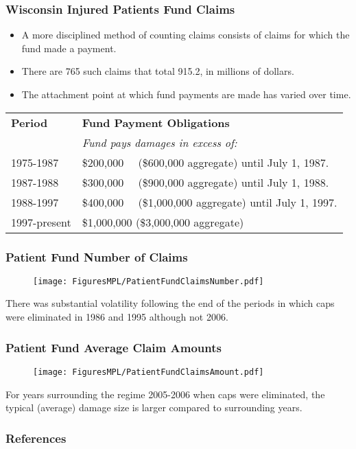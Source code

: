 \documentclass[serif,10pt]{beamer}
\begin{document}
\begin{frame}
\frametitle{Wisconsin Injured Patients Fund Claims}
  \begin{itemize}
\item A more disciplined method of counting claims consists of claims for which the fund made a payment.
\item There are 765 such claims that total 915.2, in millions of dollars.
\item The attachment point at which fund payments are made has varied over time.
\end{itemize}

\begin{table}
    \begin{tabular}{l|l}
    \hline
\textbf{Period} & \textbf{Fund Payment Obligations}\\
&\textit{Fund pays damages in excess of:}  \\ \hline
1975-1987 & \$200,000 ~~(\$600,000 aggregate) until July 1, 1987.\\
1987-1988&  \$300,000 ~~(\$900,000 aggregate) until July 1, 1988.\\
1988-1997&   \$400,000 ~~(\$1,000,000 aggregate) until July 1, 1997.\\
1997-present&   \$1,000,000 (\$3,000,000 aggregate)\\
    \hline
    \end{tabular}
\end{table}
\end{frame}


\begin{frame}
\frametitle{Patient Fund Number of Claims}
\vspace{-.2in}
\begin{figure}[htp]
    \texttt{[image: FiguresMPL/PatientFundClaimsNumber.pdf]}
\end{figure}
\vspace{-.3in}
There was substantial volatility following the end of the periods in which caps were eliminated in 1986 and 1995 although not 2006.
\end{frame}



\begin{frame}
\frametitle{Patient Fund Average Claim Amounts}
\vspace{-.2in}
\begin{figure}[htp]
    \texttt{[image: FiguresMPL/PatientFundClaimsAmount.pdf]}
\end{figure}
\vspace{-.3in}
For years surrounding the regime 2005-2006 when caps were eliminated, the typical (average) damage size is larger compared to surrounding years.
\end{frame}


\begin{frame}
\frametitle{References}

\end{frame}
\end{document}
